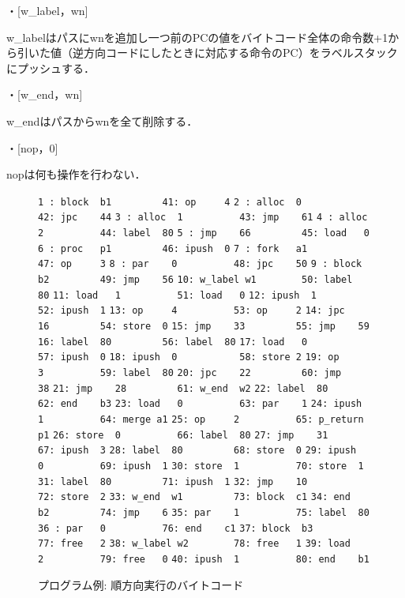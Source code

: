 \documentclass[submit,PRO]{ipsj}
\def\|{\verb|}
\begin{document}
・[w\_label，wn]

w\_labelはパスにwnを追加し一つ前のPCの値をバイトコード全体の命令数+1から引いた値（逆方向コードにしたときに対応する命令のPC）をラベルスタックにプッシュする．

・[w\_end，wn]

w\_endはパスからwnを全て削除する．

・[nop，0]

nopは何も操作を行わない．


\begin{figure}[tb]
\vbox{
\hbox{\|1 : block  b1         41: op     4|}
\hbox{\|2 : alloc  0          42: jpc    44|}
\hbox{\|3 : alloc  1          43: jmp    61|}
\hbox{\|4 : alloc  2          44: label  80|}
\hbox{\|5 : jmp    66         45: load   0|}
\hbox{\|6 : proc   p1         46: ipush  0|}
\hbox{\|7 : fork   a1         47: op     3|}
\hbox{\|8 : par    0          48: jpc    50|}
\hbox{\|9 : block  b2         49: jmp    56|}
\hbox{\|10: w_label w1        50: label  80|}
\hbox{\|11: load   1          51: load   0|}
\hbox{\|12: ipush  1          52: ipush  1|}
\hbox{\|13: op     4          53: op     2|}
\hbox{\|14: jpc    16         54: store  0|}
\hbox{\|15: jmp    33         55: jmp    59|}
\hbox{\|16: label  80         56: label  80|}
\hbox{\|17: load   0          57: ipush  0|}
\hbox{\|18: ipush  0           58: store 2|}
\hbox{\|19: op     3          59: label  80|}
\hbox{\|20: jpc    22         60: jmp    38|}
\hbox{\|21: jmp    28         61: w_end  w2|}
\hbox{\|22: label  80         62: end    b3|}
\hbox{\|23: load   0          63: par    1|}
\hbox{\|24: ipush  1          64: merge a1|}
\hbox{\|25: op     2          65: p_return p1|}
\hbox{\|26: store  0          66: label  80|}
\hbox{\|27: jmp    31         67: ipush  3|}
\hbox{\|28: label  80         68: store  0|}
\hbox{\|29: ipush  0          69: ipush  1|}
\hbox{\|30: store  1          70: store  1|}
\hbox{\|31: label  80         71: ipush  1|}
\hbox{\|32: jmp    10         72: store  2|}
\hbox{\|33: w_end  w1         73: block  c1|}
\hbox{\|34: end    b2         74: jmp    6|}
\hbox{\|35: par    1          75: label  80|}
\hbox{\|36 : par   0          76: end    c1|}
\hbox{\|37: block  b3         77: free   2|}
\hbox{\|38: w_label w2        78: free   1|}
\hbox{\|39: load   2          79: free   0|}
\hbox{\|40: ipush  1          80: end    b1|}
}
\centerline{}
\caption{プログラム例: 順方向実行のバイトコード}
\label{fig:bytecode}
\end{figure}
\end{document}
